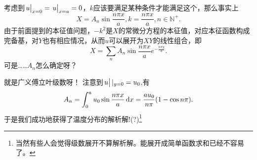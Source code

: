 \documentclass[12pt,a4paper,openany,twoside]{book}
\numberwithin{equation}{section}
\begin{document}
        考虑到$\eval{u}_{x=0}=\eval{u}_{x=a}=0$，$k$应该要满足某种条件才能满足这个，那么事实上
        \begin{equation}
          X = A_n \sin{\frac{n\pi x}{a}} , k = \frac{n\pi x}{a}, n \in\mathbb{N}^+.
        \end{equation}
        由于前面提到的本征值问题，$-k^2$是$X$的常微分方程的本征值，对应本征函数构成完备基，对$Y$也有相应情况，从而$u$可以展开为$XY$的线性组合，即
        \begin{equation}
          X = \sum_n{A_n \sin{\frac{n\pi x}{a}} e^{- \frac{n\pi y}{a}}}.
        \end{equation}
        可是……$A_n$怎么确定呀？
        
        就是广义傅立叶级数呀！
        注意到$\eval{u}|_{y=0} = u_0$,有
        \begin{equation}
          A_n = \int^a_0{u_0 \sin{\frac{n\pi x}{a}}\dd{x}}=\frac{a u_0}{n\pi}\qty(1-\cos{n\pi}) .
        \end{equation}
        于是我们成功地获得了温度分布的解析解!(?)\footnote{当然有些人会觉得级数展开不算解析解。能展开成简单函数求和已经不容易了。}
\end{document}
